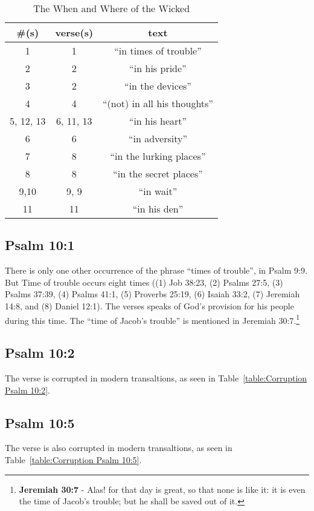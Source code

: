 \begin{table}[]
\begin{center}
\begin{tabular}{|c|c|c|}
\hline 
\#(s) & verse(s) & text \\ \hline 
1 & 1 & ``in times of trouble'' \\ \hline 
2 & 2 & ``in his pride'' \\ \hline 
3 & 2 & ``in the devices'' \\ \hline 
4 & 4 & ``(not) in all his thoughts'' \\ \hline 
5, 12, 13 & 6, 11, 13 & ``in  his heart'' \\ \hline 
6 & 6 & ``in adversity'' \\ \hline 
7 & 8 & ``in the lurking places'' \\ \hline 
8 & 8 & ``in the secret places'' \\ \hline 
9,10 & 9, 9 & ``in wait'' \\ \hline 
11 & 11 & ``in his den'' \\ \hline 
\end{tabular}

\label{table:WhenAndWhereOfTheWicked}
\caption[The When and Where of the Wicked]{The When and Where of the Wicked}
\end{center}
\end{table}


\subsection{Psalm 10:1}
There is only one other occurrence of the phrase ``times of trouble'', in Psalm 9:9. But Time of trouble occurs eight times ((1) Job 38:23, (2) Psalms 27:5, (3) Psalms 37:39, (4) Psalms 41:1, (5) Proverbs 25:19, (6) Isaiah 33:2, (7) Jeremiah 14:8, and (8) Daniel 12:1). The verses speaks of God's provision for his people during this time. The ``time of Jacob's trouble'' is mentioned in Jeremiah 30:7.\footnote{\textbf{Jeremiah 30:7} - Alas! for that day is great, so that none is like it: it is even the time of Jacob’s trouble; but he shall be saved out of it.}

\subsection{Psalm 10:2}
The verse is corrupted in modern transaltions, as seen in Table~\ref{table:Corruption Psalm 10:2}.



\subsection{Psalm 10:5}
The verse is also corrupted in modern transaltions, as seen in Table~\ref{table:Corruption Psalm 10:5}.




